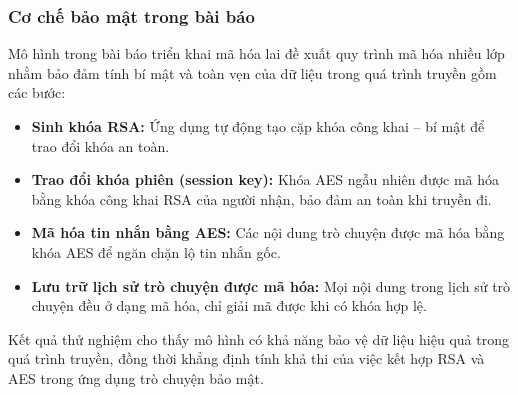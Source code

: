 \subsubsection{Cơ chế bảo mật trong bài báo}
\indent Mô hình trong bài báo triển khai mã hóa lai đề xuất quy trình mã hóa nhiều lớp nhằm bảo đảm tính bí mật và toàn vẹn của dữ liệu trong quá trình truyền gồm các bước:
\begin{itemize}
    \item \textbf{Sinh khóa RSA: } Ứng dụng tự động tạo cặp khóa công khai – bí mật để trao đổi khóa an toàn.
    \item \textbf{Trao đổi khóa phiên (session key): } Khóa AES ngẫu nhiên được mã hóa bằng khóa công khai RSA của người nhận, bảo đảm an toàn khi truyền đi.
    
    \item \textbf{Mã hóa tin nhắn bằng AES: } Các nội dung trò chuyện được mã hóa bằng khóa AES để ngăn chặn lộ tin nhắn gốc.
    
    \item \textbf{Lưu trữ lịch sử trò chuyện được mã hóa: } Mọi nội dung trong lịch sử trò chuyện đều ở dạng mã hóa, chỉ giải mã được khi có khóa hợp lệ.

\end{itemize}

\indent Kết quả thử nghiệm cho thấy mô hình có khả năng bảo vệ dữ liệu hiệu quả trong quá trình truyền, đồng thời khẳng định tính khả thi của việc kết hợp RSA và AES trong ứng dụng trò chuyện bảo mật. 
